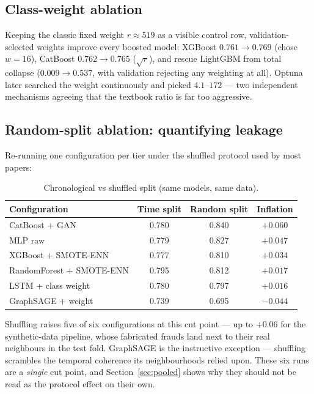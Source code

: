 \documentclass[11pt,a4paper]{article}
\begin{document}
\subsection{Class-weight ablation}\label{sec:weightab}
Keeping the classic fixed weight $r \approx 519$ as a visible control row, validation-selected
weights improve every boosted model: XGBoost $0.761 \to 0.769$ (chose $w{=}16$),
CatBoost $0.762 \to 0.765$ ($\sqrt{r}$), and rescue LightGBM from total collapse
($0.009 \to 0.537$, with validation rejecting any weighting at all). Optuna later searched the
weight continuously and picked $4.1$--$172$ --- two independent mechanisms agreeing that the
textbook ratio is far too aggressive.

\subsection{Random-split ablation: quantifying leakage}\label{sec:splittab}
Re-running one configuration per tier under the shuffled protocol used by most papers:

\begin{table}[h]
      \centering\small
      \caption{Chronological vs shuffled split (same models, same data).}
      \label{tab:splits}
      \begin{tabular}{lccc}
            \toprule
            Configuration & Time split & Random split & Inflation\\
            \midrule
            CatBoost + GAN & 0.780 & 0.840 & $+0.060$\\
            MLP raw & 0.779 & 0.827 & $+0.047$\\
            XGBoost + SMOTE-ENN & 0.777 & 0.810 & $+0.034$\\
            RandomForest + SMOTE-ENN & 0.795 & 0.812 & $+0.017$\\
            LSTM + class weight & 0.780 & 0.797 & $+0.016$\\
            GraphSAGE + weight & 0.739 & 0.695 & $-0.044$\\
            \bottomrule
      \end{tabular}
\end{table}

Shuffling raises five of six configurations at this cut point --- up to $+0.06$ for the
synthetic-data pipeline, whose fabricated frauds land next to their real neighbours in the test
fold. GraphSAGE is the instructive exception --- shuffling scrambles the temporal coherence its
neighbourhoods relied upon. These six runs are a \emph{single} cut point, and
Section~\ref{sec:pooled} shows why they should not be read as the protocol effect on their own.
\end{document}
